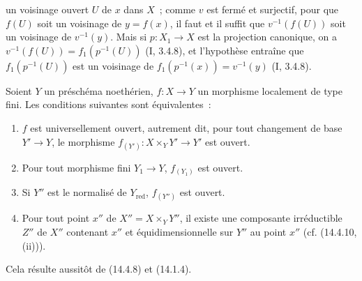 
un voisinage ouvert $U$ de $x$ dans $X$~; comme $v$ est fermé et surjectif, pour
que $f(U)$ soit un voisinage de $y=f(x)$, il faut et il suffit que
$v^{-1}(f(U))$ soit un voisinage de $v^{-1}(y)$. Mais si $p:X_1\to X$ est la
projection canonique, on a $v^{-1}(f(U))=f_1(p^{-1}(U))$ (I, 3.4.8), et
l'hypothèse entraîne que $f_1(p^{-1}(U))$ est un voisinage de
$f_1(p^{-1}(x))=v^{-1}(y)$ (I, 3.4.8).

\begin{corollary}[14.4.9]
\label{IV.14.4.9-fr}
Soient $Y$ un préschéma noethérien, $f:X\to Y$ un morphisme localement de type
fini. Les conditions suivantes sont équivalentes~:
\begin{enumerate}[label=\emph{\alph*)}]
  \item $f$ est universellement ouvert, autrement dit, pour tout changement de
  base $Y'\to Y$, le morphisme $f_{(Y')}:X\times_Y Y'\to Y'$ est ouvert.
  \item[a$'$)] Pour tout morphisme fini $Y_1\to Y$, $f_{(Y_1)}$ est ouvert.
  \item[a$''$)] Si $Y''$ est le normalisé de $Y_{\mathrm{red}}$, $f_{(Y'')}$ est
  ouvert.
  \item Pour tout point $x''$ de $X''=X\times_Y Y''$, il existe une composante
  irréductible $Z''$ de $X''$ contenant $x''$ et équidimensionnelle sur $Y''$ au
  point $x''$ (cf. (14.4.10, (ii))).
\end{enumerate}
\end{corollary}

Cela résulte aussitôt de (14.4.8) et (14.1.4).

